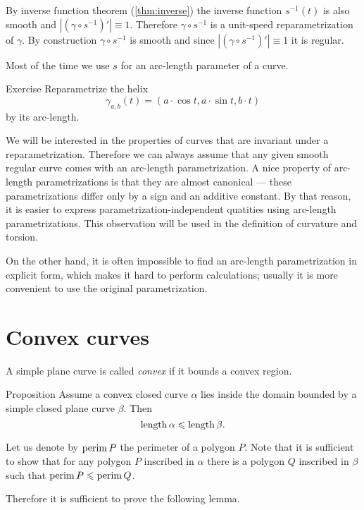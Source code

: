 By inverse function theorem (\ref{thm:inverse}) the inverse function $s^{-1}(t)$ is also smooth
and $|(\gamma\circ s^{-1})'|\equiv1$.
Therefore $\gamma\circ s^{-1}$ is a unit-speed reparametrization  of $\gamma$.
By construction $\gamma\circ s^{-1}$ is smooth and since $|(\gamma\circ s^{-1})'|\equiv1$ it is regular.
\qeds

Most of the time we use $s$ for an arc-length parameter of a curve.

\begin{thm}{Exercise}\label{ex:arc-length-helix}
Reparametrize the helix 
\[\gamma_{a,b}(t)=(a\cdot\cos t,a\cdot \sin t, b\cdot t)\]
by its arc-length.
\end{thm}

We will be interested in the properties of curves that are invariant under a reparametrization.
Therefore we can always assume that any given smooth regular curve comes with an arc-length parametrization.
A nice property of arc-length parametrizations is that they are almost canonical --- these parametrizations differ only by a sign and an additive constant.
By that reason, it is easier to express parametrization-independent quatities using arc-length parametrizations.
This observation will be used in the definition of curvature and torsion.

On the other hand, it is often impossible to find an arc-length parametrization in explicit form, which makes it hard to perform calculations;
usually it is more convenient to use the original parametrization.

\section{Convex curves}

A simple plane curve is called \emph{convex} if it bounds a convex region.

\begin{thm}{Proposition}\label{prop:convex-curve}
Assume a convex closed curve $\alpha$ lies inside the domain bounded by a simple closed plane curve $\beta$.
Then
\[\mathop{\rm length}\nolimits\alpha\leqslant \mathop{\rm length}\nolimits\beta.\]
\end{thm}

Let us denote by $\mathop{\rm perim}\nolimits P$ the perimeter of a polygon $P$.
Note that it is sufficient to show that for any polygon  $P$ inscribed in $\alpha$ there is a polygon $Q$ inscribed in $\beta$ such that
$\mathop{\rm perim}\nolimits P\leqslant \mathop{\rm perim}\nolimits Q$.

Therefore it is sufficient to prove the following lemma.


